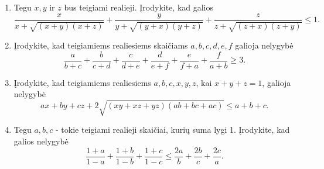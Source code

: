 \begin{enumerate}
  \item {} Tegu $x,y$ ir
    $z$ bus teigiami realieji. Įrodykite, kad galios
    $$\frac{x}{x+\sqrt{(x+y)(x+z)}}+\frac{y}{y+\sqrt{(y+x)(y+z)}}+\frac{z}{z+\sqrt{(z+x)(z+y)}}\leq1.$$
  \item Įrodykite, kad teigiamiems realiesiems skaičiams $a,b,c,d,e,f$
    galioja nelygybė
    $$\frac{a}{b+c}+\frac{b}{c+d}+\frac{c}{d+e}+\frac{d}{e+f}+\frac{e}{f+a}+\frac{f}{a+b}\geq3.$$
  \item \text{[Ukraine 2001]} Įrodykite, kad teigiamiems realiesiems
    $a,b,c,x,y,z$, kai $x+y+z=1$, galioja nelygybė
    $$ax+by+cz+2\sqrt{(xy+xz+yz)(ab+bc+ac)}\leq a+b+c.$$
  \item {} Tegu $a,b,c$ - tokie teigiami realieji
    skaičiai, kurių suma lygi 1. Įrodykite, kad galios nelygybė
    $$\frac{1+a}{1-a}+\frac{1+b}{1-b}+\frac{1+c}{1-c}\leq\frac{2a}{b}+\frac{2b}{c}+\frac{2c}{a}.$$

\end{enumerate}
